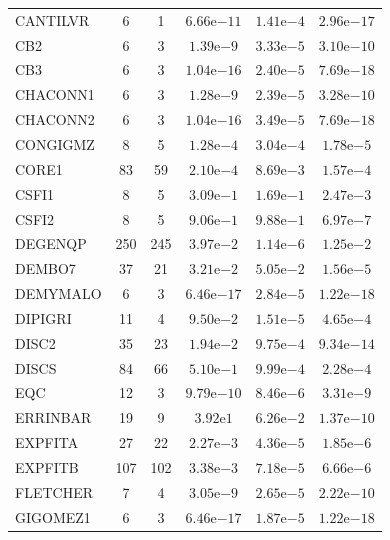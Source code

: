 \documentclass[11pt]{article}
\begin{document}
\begin{center}
\begin{longtable}{lccccc}
CANTILVR & 6 & 1 & $6.66\mathrm{e}{-11}$ & $1.41\mathrm{e}{-4}$ & $2.96\mathrm{e}{-17}$ \\
CB2 & 6 & 3 & $1.39\mathrm{e}{-9}$ & $3.33\mathrm{e}{-5}$ & $3.10\mathrm{e}{-10}$ \\
CB3 & 6 & 3 & $1.04\mathrm{e}{-16}$ & $2.40\mathrm{e}{-5}$ & $7.69\mathrm{e}{-18}$ \\
CHACONN1 & 6 & 3 & $1.28\mathrm{e}{-9}$ & $2.39\mathrm{e}{-5}$ & $3.28\mathrm{e}{-10}$ \\
CHACONN2 & 6 & 3 & $1.04\mathrm{e}{-16}$ & $3.49\mathrm{e}{-5}$ & $7.69\mathrm{e}{-18}$ \\
CONGIGMZ & 8 & 5 & $1.28\mathrm{e}{-4}$ & $3.04\mathrm{e}{-4}$ & $1.78\mathrm{e}{-5}$ \\
CORE1 & 83 & 59 & $2.10\mathrm{e}{-4}$ & $8.69\mathrm{e}{-3}$ & $1.57\mathrm{e}{-4}$ \\
CSFI1 & 8 & 5 & $3.09\mathrm{e}{-1}$ & $1.69\mathrm{e}{-1}$ & $2.47\mathrm{e}{-3}$ \\
CSFI2 & 8 & 5 & $9.06\mathrm{e}{-1}$ & $9.88\mathrm{e}{-1}$ & $6.97\mathrm{e}{-7}$ \\
DEGENQP & 250 & 245 & $3.97\mathrm{e}{-2}$ & $1.14\mathrm{e}{-6}$ & $1.25\mathrm{e}{-2}$ \\
DEMBO7 & 37 & 21 & $3.21\mathrm{e}{-2}$ & $5.05\mathrm{e}{-2}$ & $1.56\mathrm{e}{-5}$ \\
DEMYMALO & 6 & 3 & $6.46\mathrm{e}{-17}$ & $2.84\mathrm{e}{-5}$ & $1.22\mathrm{e}{-18}$ \\
DIPIGRI & 11 & 4 & $9.50\mathrm{e}{-2}$ & $1.51\mathrm{e}{-5}$ & $4.65\mathrm{e}{-4}$ \\
DISC2 & 35 & 23 & $1.94\mathrm{e}{-2}$ & $9.75\mathrm{e}{-4}$ & $9.34\mathrm{e}{-14}$ \\
DISCS & 84 & 66 & $5.10\mathrm{e}{-1}$ & $9.99\mathrm{e}{-4}$ & $2.28\mathrm{e}{-4}$ \\
EQC & 12 & 3 & $9.79\mathrm{e}{-10}$ & $8.46\mathrm{e}{-6}$ & $3.31\mathrm{e}{-9}$ \\
ERRINBAR & 19 & 9 & $3.92\mathrm{e}{1}$ & $6.26\mathrm{e}{-2}$ & $1.37\mathrm{e}{-10}$ \\
EXPFITA & 27 & 22 & $2.27\mathrm{e}{-3}$ & $4.36\mathrm{e}{-5}$ & $1.85\mathrm{e}{-6}$ \\
EXPFITB & 107 & 102 & $3.38\mathrm{e}{-3}$ & $7.18\mathrm{e}{-5}$ & $6.66\mathrm{e}{-6}$ \\
FLETCHER & 7 & 4 & $3.05\mathrm{e}{-9}$ & $2.65\mathrm{e}{-5}$ & $2.22\mathrm{e}{-10}$ \\
GIGOMEZ1 & 6 & 3 & $6.46\mathrm{e}{-17}$ & $1.87\mathrm{e}{-5}$ & $1.22\mathrm{e}{-18}$ \\

\end{longtable}
\end{center}
\end{document}
